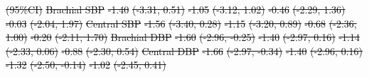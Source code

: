 \documentclass[
  letterpaper,
  DIV=11,
  numbers=noendperiod]{scrartcl}
\makeatletter
\renewenvironment{table}%
   {\renewcommand\familydefault\sfdefault
    \@float{table}}
   {\end@float}
\providecommand{\DIFdeltex}[1]{{\protect\color{red}\sout{#1}}}                      %
\providecommand{\DIFdelFL}[1]{\DIFdel{#1}} %
\providecommand{\DIFaddbeginFL}{} %
\providecommand{\DIFdelendFL}{} %
\providecommand{\DIFdel}[1]{\texorpdfstring{\DIFdeltex{#1}}{}} %
\newcommand{\DIFaddincludegraphics}[2][]{{\color{blue}\fbox{\DIFOincludegraphics[#1]{#2}}}} %
\DeclareRobustCommand{\DIFaddbeginFL}{\DIFOaddbeginFL \let\includegraphics\DIFaddincludegraphics} %
\DeclareRobustCommand{\DIFdelendFL}{\DIFOaddendFL \let\includegraphics\DIFOincludegraphics} %
\makeatother
\begin{document}
\begin{table}
\DIFdelFL{(95\%CI)}%
\DIFdelFL{Brachial SBP }%
\DIFdelFL{-1.40 }%
\DIFdelFL{(-3.31, 0.51) }%
\DIFdelFL{-1.05 }%
\DIFdelFL{(-3.12, 1.02) }%
\DIFdelFL{-0.46 }%
\DIFdelFL{(-2.29, 1.36) }%
\DIFdelFL{-0.03 }%
\DIFdelFL{(-2.04, 1.97)}%
\DIFdelFL{Central SBP }%
\DIFdelFL{-1.56 }%
\DIFdelFL{(-3.40, 0.28) }%
\DIFdelFL{-1.15 }%
\DIFdelFL{(-3.20, 0.89) }%
\DIFdelFL{-0.68 }%
\DIFdelFL{(-2.36, 1.00) }%
\DIFdelFL{-0.20 }%
\DIFdelFL{(-2.11, 1.70)}%
\DIFdelFL{Brachial DBP }%
\DIFdelFL{-1.60 }%
\DIFdelFL{(-2.96, -0.25) }%
\DIFdelFL{-1.40 }%
\DIFdelFL{(-2.97, 0.16) }%
\DIFdelFL{-1.14 }%
\DIFdelFL{(-2.33, 0.06) }%
\DIFdelFL{-0.88 }%
\DIFdelFL{(-2.30, 0.54)}%
\DIFdelFL{Central DBP }%
\DIFdelFL{-1.66 }%
\DIFdelFL{(-2.97, -0.34) }%
\DIFdelFL{-1.40 }%
\DIFdelFL{(-2.96, 0.16) }%
\DIFdelFL{-1.32 }%
\DIFdelFL{(-2.50, -0.14) }%
\DIFdelFL{-1.02 }%
\DIFdelFL{(-2.45, 0.41)}%
\DIFdelendFL \DIFaddbeginFL \centering{

}
\end{table}
\end{document}
